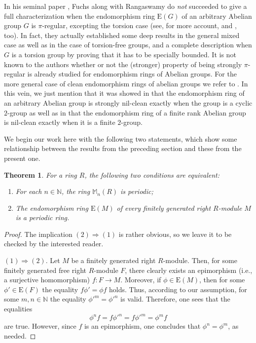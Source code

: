 \documentclass[12pt]{amsart}
\newtheorem{thm}{Theorem}[section]
\theoremstyle{definition}
\theoremstyle{remark}
\numberwithin{equation}{section}
\begin{document}
In his seminal paper \cite{FR}, Fuchs along with Rangaswamy do {\it not} succeeded to give a full characterization when the endomorphism ring $\mathrm{E}(G)$ of an arbitrary Abelian group $G$ is $\pi$-regular, excepting the torsion case (see, for more account, \cite{F} and \cite{krylov2013endomorphism}, too). In fact, they actually established some deep results in the general mixed case as well as in the case of torsion-free groups, and a complete description when $G$ is a torsion group by proving that it has to be specially bounded. It is not known to the authors whether or not the (stronger) property of being strongly $\pi$-regular is already studied for endomorphism rings of Abelian groups. For the more general case of clean endomorphism rings of abelian groups we refer to \cite{GV}. In this vein, we just mention that it was showed in \cite[Proposition 10]{BCDM} that the endomorphism ring of an arbitrary Abelian group is strongly nil-clean exactly when the group is a cyclic $2$-group as well as in \cite[Proposition 9]{BCDM} that the endomorphism ring of a finite rank Abelian group is nil-clean exactly when it is a finite $2$-group.

We begin our work here with the following two statements, which show some relationship between the results from the preceding section and these from the present one.

\begin{thm} For a ring $R$, the following two conditions are equivalent:
\begin{enumerate}
 \item[\rm{(1)}] For each $n\in \mathbb{N}$, the ring $\mathbb{M}_n(R)$ is periodic;

 \item[\rm{(2)}] The endomorphism ring $\mathrm{E}(M)$ of every finitely generated right $R$-module $M$ is a periodic ring.
\end{enumerate}
\end{thm}

\begin{proof}
The implication $(2)\Rightarrow (1)$ is rather obvious, so we leave it to be checked by the interested reader.

$(1)\Rightarrow (2)$. Let $M$ be a finitely generated right $R$-module. Then, for some finitely generated free right $R$-module $F$, there clearly exists an epimorphism (i.e., a surjective homomorphism) $f: F\to M$. Moreover, if $\phi\in \mathrm{E}(M)$, then for some $\phi'\in \mathrm{E}(F)$ the equality $f\phi'=\phi f$ holds. Thus, according to our assumption, for some $m,n \in \mathbb{N}$ the equality $\phi'^m=\phi'^n$ is valid. Therefore, one sees that the equalities
$$\phi ^nf= f\phi'^n=f\phi'^m=\phi^mf$$
\noindent are true. However, since $f$ is an epimorphism, one concludes that $\phi^n=\phi^m$, as needed.
\end{proof}
\end{document}
